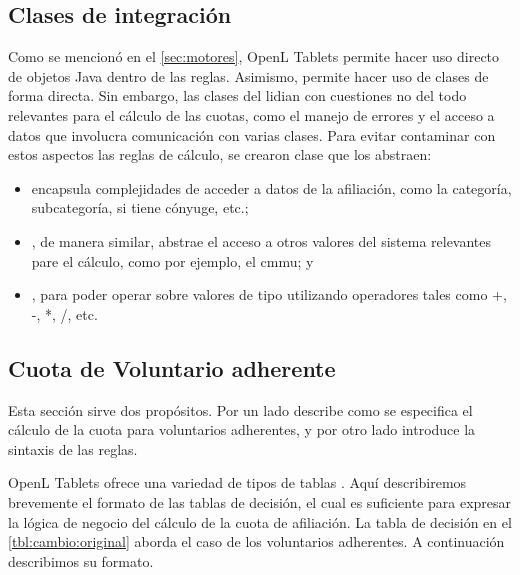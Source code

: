 \subsection{Clases de integración}\label{ssec:integracion:clases}

Como se mencionó en el \cref{sec:motores}, OpenL Tablets permite hacer uso directo de objetos Java dentro de las reglas.
Asimismo, permite hacer uso de clases de forma directa.
Sin embargo, las clases del {\SIDOSPU} lidian con cuestiones no del todo relevantes para el cálculo de las cuotas, como el manejo de errores y el acceso a datos que involucra comunicación con varias clases.
Para evitar contaminar con estos aspectos las reglas de cálculo, se crearon clase que los abstraen:
\begin{itemize}
    \item {} encapsula complejidades de acceder a datos de la afiliación, como la categoría, subcategoría, si tiene cónyuge, etc.;
    \item {}, de manera similar, abstrae el acceso a otros valores del sistema relevantes pare el cálculo, como por ejemplo, el \acrshort{cmmu}; y
    \item {}, para poder operar sobre valores de tipo  utilizando operadores tales como +, -, *, /, etc.
\end{itemize}

\subsection{Cuota de Voluntario adherente}


Esta sección sirve dos propósitos.
Por un lado describe como se especifica el cálculo de la cuota para voluntarios adherentes, y por otro lado introduce la sintaxis de las reglas.

OpenL Tablets ofrece una variedad de tipos de tablas \cite{openl-decision-table}.
Aquí describiremos brevemente el formato de las tablas de decisión, el cual es suficiente para expresar la lógica de negocio del cálculo de la cuota de afiliación.
%
La tabla de decisión en el \cref{tbl:cambio:original} aborda el caso de los voluntarios adherentes.
A continuación describimos su formato.

